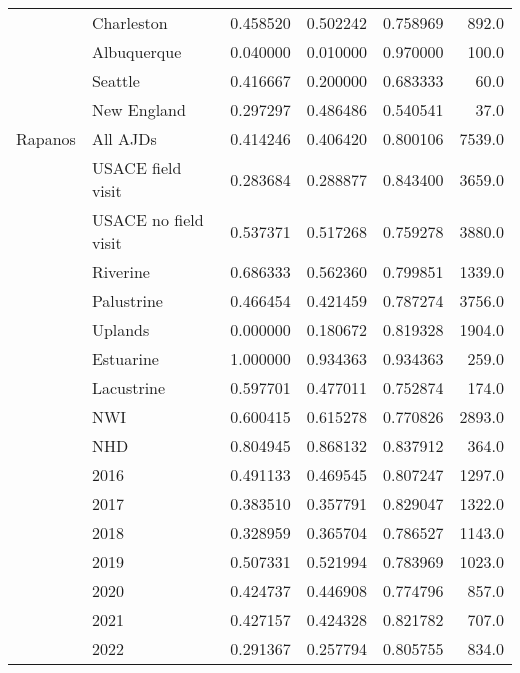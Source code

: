 \begin{tabular}{llrrrr}
     & Charleston &        0.458520 &               0.502242 &  0.758969 &    892.0 \\
     & Albuquerque &        0.040000 &               0.010000 &  0.970000 &    100.0 \\
     & Seattle &        0.416667 &               0.200000 &  0.683333 &     60.0 \\
     & New England &        0.297297 &               0.486486 &  0.540541 &     37.0 \\
Rapanos & All AJDs &        0.414246 &               0.406420 &  0.800106 &   7539.0 \\
     & USACE field visit &        0.283684 &               0.288877 &  0.843400 &   3659.0 \\
     & USACE no field visit &        0.537371 &               0.517268 &  0.759278 &   3880.0 \\
     & Riverine &        0.686333 &               0.562360 &  0.799851 &   1339.0 \\
     & Palustrine &        0.466454 &               0.421459 &  0.787274 &   3756.0 \\
     & Uplands &        0.000000 &               0.180672 &  0.819328 &   1904.0 \\
     & Estuarine &        1.000000 &               0.934363 &  0.934363 &    259.0 \\
     & Lacustrine &        0.597701 &               0.477011 &  0.752874 &    174.0 \\
     & NWI &        0.600415 &               0.615278 &  0.770826 &   2893.0 \\
     & NHD &        0.804945 &               0.868132 &  0.837912 &    364.0 \\
     & 2016 &        0.491133 &               0.469545 &  0.807247 &   1297.0 \\
     & 2017 &        0.383510 &               0.357791 &  0.829047 &   1322.0 \\
     & 2018 &        0.328959 &               0.365704 &  0.786527 &   1143.0 \\
     & 2019 &        0.507331 &               0.521994 &  0.783969 &   1023.0 \\
     & 2020 &        0.424737 &               0.446908 &  0.774796 &    857.0 \\
     & 2021 &        0.427157 &               0.424328 &  0.821782 &    707.0 \\
     & 2022 &        0.291367 &               0.257794 &  0.805755 &    834.0 \\

\end{tabular}
